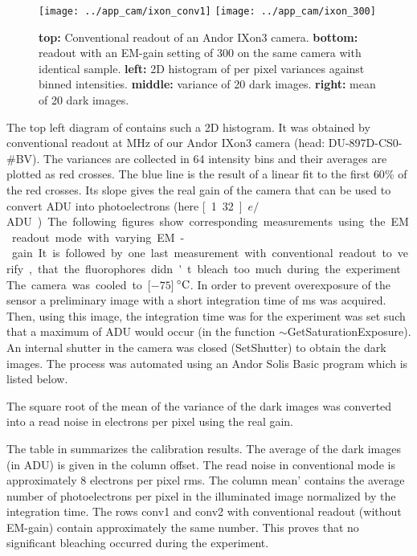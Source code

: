\begin{figure}
  \centering
  \texttt{[image: ../app\_cam/ixon\_conv1]}
  \texttt{[image: ../app\_cam/ixon\_300]}
  \caption{{\bf top:} Conventional readout of an Andor IXon3
    camera. {\bf bottom:} readout with an EM-gain setting of 300 on
    the same camera with identical sample. {\bf left:} 2D histogram of
    per pixel variances against binned intensities. {\bf middle:}
    variance of 20 dark images. {\bf right:} mean of 20 dark images.}
  \label{fig:ixon}
\end{figure}
  
The top left diagram of  contains such a 2D
histogram. It was obtained by conventional readout at \unit[3]{MHz} of
our Andor IXon3 camera (head: DU-897D-CS0-\#BV). The variances are
collected in 64 intensity bins and their averages are plotted as red
crosses. The blue line is the result of a linear fit to the first
$60\%$ of the red crosses. Its slope gives the real gain of the camera
that can be used to convert ADU into photoelectrons (here
\unit[1.32]{$e/$ADU}).

The following figures show corresponding measurements using the EM
readout mode with varying EM-gain. It is followed by one last
measurement with conventional readout to verify, that the fluorophores
didn't bleach too much during the experiment.

The camera was cooled to \unit[$-75$]{$\,^{\circ}{\rm C}$}. In order
to prevent overexposure of the sensor a preliminary image with a short
integration time of \unit[10]{ms} was acquired. Then, using this
image, the integration time was for the experiment was set such that a
maximum of \unit[10000]{ADU} would occur (in the function
\textsf{$\sim$GetSaturationExposure}). An internal shutter in the camera
was closed (\textsf{SetShutter}) to obtain the dark images. The process
was automated using an Andor Solis Basic program which is listed
below.


The square root of the mean of the variance of the dark images was
converted into a read noise in electrons per pixel using the real
gain.

The table in  summarizes the calibration
results. The average of the dark images (in ADU) is given in the
column \textsf{offset}. The read noise in conventional mode is
approximately 8 electrons per pixel rms. The column \textsf{mean'}
contains the average number of photoelectrons per pixel in the
illuminated image normalized by the integration time. The rows
\textsf{conv1} and \textsf{conv2} with conventional readout (without
EM-gain) contain approximately the same number. This proves that no
significant bleaching occurred during the experiment.

